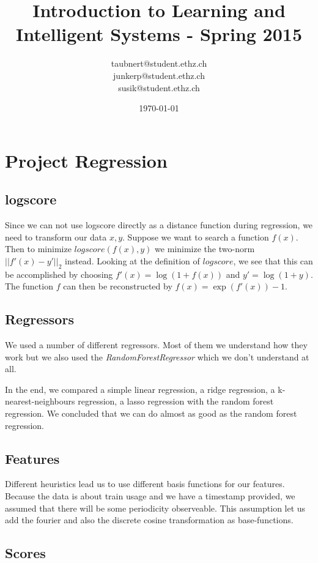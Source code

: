 \documentclass[a4paper, 11pt]{article}
\title{Introduction to Learning and Intelligent Systems - Spring 2015}
\author{taubnert@student.ethz.ch\\ junkerp@student.ethz.ch\\ susik@student.ethz.ch\\}
\date{\today}
\begin{document}
\maketitle

\section{Project Regression}



\subsection{logscore}
Since we can not use logscore directly as a distance function during regression,
we need to transform our data $x,y$.
Suppose we want to search a function $f(x)$.
Then to minimize $logscore(f(x),y)$ we minimize the two-norm $||f'(x) - y'||_2$ instead.
Looking at the definition of $logscore$, we see that this can be accomplished by choosing $f'(x) = \log(1 + f(x))$ and $y' = \log(1 + y)$.
The function $f$ can then be reconstructed by $f(x) = \exp(f'(x)) - 1$.

\subsection{Regressors}
We used a number of different regressors.
Most of them we understand how they work but we also used the \emph{RandomForestRegressor} which we don't understand at all.

In the end, we compared a simple linear regression, a ridge regression, a k-nearest-neighbours regression, a lasso regression with the random forest regression.
We concluded that we can do almost as good as the random forest regression.

\subsection{Features}
Different heuristics lead us to use different basis functions for our features.
Because the data is about train usage and we have a timestamp provided, we assumed that there will be some periodicity observeable.
This assumption let us add the fourier and also the discrete cosine transformation as base-functions.

\subsection{Scores}



\end{document}
